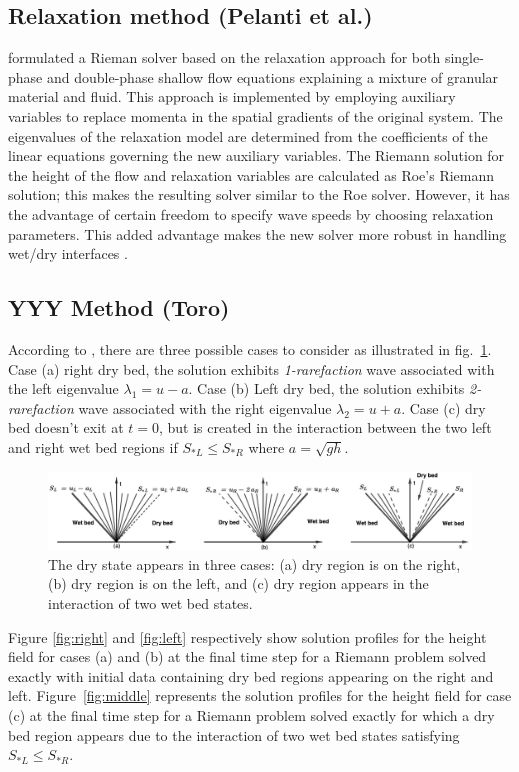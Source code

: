 \documentclass[11pt,a4paper]{article}
\newcommand{\donna}[1]{{\color{red}{#1}}}
\begin{document}
	\subsection{Relaxation method (Pelanti et al.)}

 \citet{pelanti2011riemann} formulated a Rieman solver based on the relaxation approach for both single-phase and double-phase shallow flow equations explaining a mixture of granular material and fluid. This approach is implemented by employing auxiliary variables to replace momenta in the spatial gradients of the original system. The eigenvalues of the relaxation model are determined from the coefficients of the linear equations governing the new auxiliary variables.  The Riemann solution for the height of the flow and relaxation variables are calculated as Roe's Riemann solution; this makes the resulting solver similar to the Roe solver. However, it has the advantage of certain freedom to specify wave speeds by choosing relaxation parameters. This added advantage makes the new solver more robust in handling wet/dry interfaces \cite{pelanti2008relaxation,pelanti2011riemann}.

	\subsection{YYY Method (Toro)}
	According to \citet{toro2001shock}, there are three possible cases to consider as illustrated in fig.~\ref{fig:dry-wet}. Case (a) right dry bed, the solution exhibits {\em 1-rarefaction} wave associated with the left eigenvalue $\lambda_1 = u - a$. Case (b) Left dry bed, the solution exhibits {\em 2-rarefaction} wave associated with the right eigenvalue $\lambda_2 = u + a$. Case (c) dry bed doesn't exit at $t=0$, but is created in the interaction between the two left and right wet bed regions if $S_{*L} \le S_{*R}$ where $a = \sqrt{gh}$.
		\begin{figure}[H]
		\centering
		\includegraphics[width=0.5\linewidth]{images/dry-wet}
		\caption{The dry state appears in three cases: (a) dry region is on the right, (b) dry region is on the left, and (c) dry region appears in the interaction of two wet bed states.}
		\label{fig:dry-wet}
	\end{figure}
	
	\donna{make figures larger;   put three on single line}
	Figure \ref{fig:right} and \ref{fig:left} respectively show solution profiles for the height field for cases (a) and (b) at the final time step for a Riemann problem  solved exactly with initial data containing dry bed regions appearing on the right and left. Figure~\ref{fig:middle} represents the  solution profiles for the height field  for case (c) at the final time step for a Riemann problem  solved exactly for which a dry bed region appears due to the interaction of two wet bed states satisfying $S_{*L} \le S_{*R}$.
	
\end{document}
